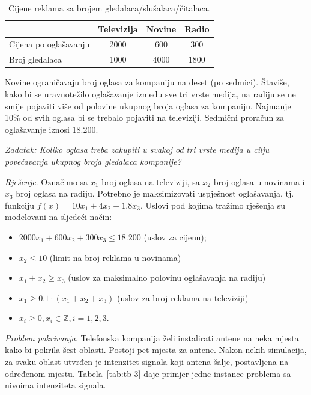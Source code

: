 \documentclass[a4paper, utf8, 11pt, colorlinks]{book}
\begin{document}
\begin{table}[!ht]
    \centering
    \begin{tabular}{l|c|c|c} \hline
                 \                  & Televizija & Novine & Radio  \\ \hline
         Cijena po oglašavanju      & 2000       & 600    & 300    \\
         Broj gledalaca             & 1000      & 4000  & 1800 \\ \hline
    \end{tabular}
    \caption{Cijene reklama sa brojem gledalaca/slušalaca/čitalaca.}
    \label{tab:tab_model_advertising}
\end{table}

Novine ograničavaju broj oglasa za kompaniju na deset (po sedmici). Štaviše, kako bi se uravnotežilo oglašavanje između sve tri vrste medija, na radiju se ne smije pojaviti više od polovine ukupnog broja oglasa za kompaniju. Najmanje 10\% od svih oglasa bi se trebalo pojaviti na televiziji. Sedmični proračun za oglašavanje iznosi 18.200. 

\emph{Zadatak: Koliko oglasa treba zakupiti u svakoj od tri vrste medija u cilju povećavanja ukupnog broja gledalaca kompanije?}

\emph{Rješenje}.   Označimo sa $x_1$ broj oglasa na televiziji, sa $x_2$ broj oglasa u novinama i $x_3$ broj oglasa na radiju. Potrebno je maksimizovati   uspješnost oglašavanja, tj. funkciju 
$f(x) = 10 x_1 + 4 x_2 + 1.8 x_3.$ Uslovi pod kojima tražimo rješenja su modelovani na sljedeći način:
\begin{itemize}
    \item $2000 x_1 + 600 x_2 + 300 x_3 \leq 18.200$ (uslov za cijenu);
    \item  $ x_2 \leq 10$ (limit na broj reklama u novinama)
    \item $x_1 + x_2 \geq x_3$ (uslov za maksimalno polovinu oglašavanja na radiju) 
    \item ${x_1}\geq 0.1\cdot (x_1 + x_2 + x_3)$ (uslov za broj reklama na televiziji)
    \item $x_i \geq 0, x_i \in \mathbb{Z}, i=1,2,3$.
\end{itemize}
\emph{Problem pokrivanja}. Telefonska kompanija želi instalirati antene na neka mjesta kako bi pokrila šest oblasti. Postoji pet mjesta za antene. Nakon nekih simulacija, za svaku oblast utvrđen je intenzitet signala koji antena šalje, postavljena na određenom mjestu. Tabela~\ref{tab:tb-3} daje   primjer jedne instance problema sa nivoima intenziteta signala.
\end{document}
